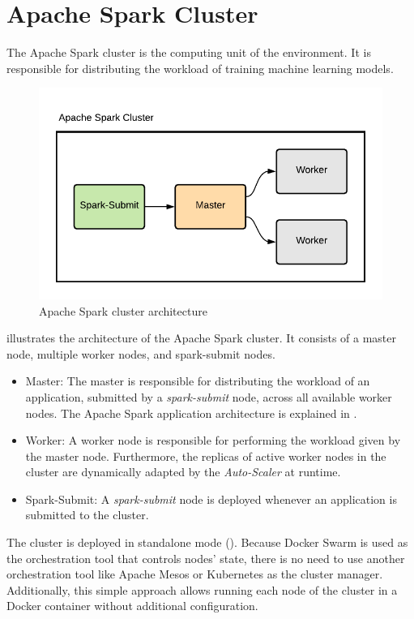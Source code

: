 \section{Apache Spark Cluster}
\label{sec:05_spark}
The Apache Spark cluster is the computing unit of the environment. It is responsible for distributing the workload of training machine learning models.
\begin{figure}[h]
\centering
\includegraphics[scale=1]{images/05_conceptual_design/apache_spark/apache_spark_cluster}
\caption{Apache Spark cluster architecture}
\label{fig:05_spark_arch}
\end{figure}
 illustrates the architecture of the Apache Spark cluster. It consists of a master node, multiple worker nodes, and spark-submit nodes.

\begin{itemize}
\item Master: The master is responsible for distributing the workload of an application, submitted by a \textit{spark-submit} node, across all available worker nodes. The Apache Spark application architecture is explained in .

\item Worker: A worker node is responsible for performing the workload given by the master node. Furthermore, the replicas of active worker nodes in the cluster are dynamically adapted by the \textit{Auto-Scaler} at runtime.

\item Spark-Submit: A \textit{spark-submit} node is deployed whenever an application is submitted to the cluster.
\end{itemize}
The cluster is deployed in standalone mode (). Because Docker Swarm is used as the orchestration tool that controls nodes' state, there is no need to use another orchestration tool like Apache Mesos or Kubernetes as the cluster manager.
Additionally, this simple approach allows running each node of the cluster in a Docker container without additional configuration.


